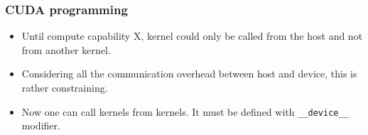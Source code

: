 \begin{frame}[fragile]
  \frametitle{CUDA programming}
\begin{itemize}
\item Until compute capability X, kernel could only be called from the host and not from another kernel.
\item Considering all the communication overhead between host and device, this is rather constraining.
\item Now one can call kernels from kernels. It must be defined with {\color{mycolorcode}\verb|__device__|} modifier.
\end{itemize}
\end{frame}
